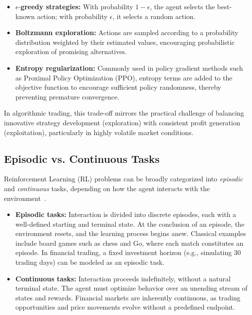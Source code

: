 \documentclass[12pt,a4paper]{report}
\begin{document}
\begin{itemize}
    \item \boldmath$\epsilon$-\textbf{greedy strategies:} With probability $1-\epsilon$, the agent selects the best-known action; with probability $\epsilon$, it selects a random action. 
    
    \item \textbf{Boltzmann exploration:} Actions are sampled according to a probability distribution weighted by their estimated values, encouraging probabilistic exploration of promising alternatives. 
    
    \item \textbf{Entropy regularization:} Commonly used in policy gradient methods such as Proximal Policy Optimization (PPO), entropy terms are added to the objective function to encourage sufficient policy randomness, thereby preventing premature convergence.
\end{itemize}

In algorithmic trading, this trade-off mirrors the practical challenge of balancing innovative strategy development (exploration) with consistent profit generation (exploitation), particularly in highly volatile market conditions.

\subsection{Episodic vs. Continuous Tasks}

Reinforcement Learning (RL) problems can be broadly categorized into \textit{episodic} and \textit{continuous} tasks, depending on how the agent interacts with the environment~\cite{sutton2018reinforcement}.

\begin{itemize}
    \item \textbf{Episodic tasks:} Interaction is divided into discrete episodes, each with a well-defined starting and terminal state. At the conclusion of an episode, the environment resets, and the learning process begins anew. Classical examples include board games such as chess and Go, where each match constitutes an episode. In financial trading, a fixed investment horizon (e.g., simulating 30 trading days) can be modeled as an episodic task.
    
    \item \textbf{Continuous tasks:} Interaction proceeds indefinitely, without a natural terminal state. The agent must optimize behavior over an unending stream of states and rewards. Financial markets are inherently continuous, as trading opportunities and price movements evolve without a predefined endpoint.
\end{itemize}
\end{document}
